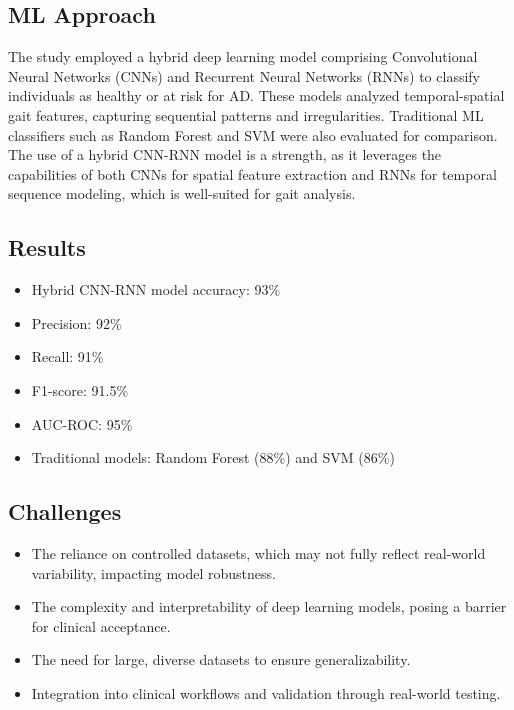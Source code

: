 \subsection*{ML Approach}
The study employed a hybrid deep learning model comprising Convolutional Neural Networks (CNNs) and Recurrent Neural Networks (RNNs) to classify individuals as healthy or at risk for AD. These models analyzed temporal-spatial gait features, capturing sequential patterns and irregularities. Traditional ML classifiers such as Random Forest and SVM were also evaluated for comparison. The use of a hybrid CNN-RNN model is a strength, as it leverages the capabilities of both CNNs for spatial feature extraction and RNNs for temporal sequence modeling, which is well-suited for gait analysis.

\subsection*{Results}
\begin{itemize}
    \item Hybrid CNN-RNN model accuracy: 93\%
    \item Precision: 92\% 
    \item Recall: 91\%
    \item F1-score: 91.5\%
    \item AUC-ROC: 95\%
    \item Traditional models: Random Forest (88\%) and SVM (86\%)
\end{itemize}

\subsection*{Challenges}
\begin{itemize}
    \item The reliance on controlled datasets, which may not fully reflect real-world variability, impacting model robustness.
    \item The complexity and interpretability of deep learning models, posing a barrier for clinical acceptance.
    \item The need for large, diverse datasets to ensure generalizability.
    \item Integration into clinical workflows and validation through real-world testing.
\end{itemize}

